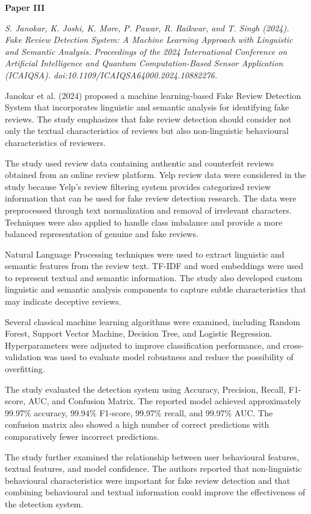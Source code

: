\documentclass[12pt,a4paper]{report}
\begin{document}
\textbf{Paper III}

\textit{S. Janokar, K. Joshi, K. More, P. Pawar, R. Raikwar, and T. Singh (2024). Fake Review Detection System: A Machine Learning Approach with Linguistic and Semantic Analysis. Proceedings of the 2024 International Conference on Artificial Intelligence and Quantum Computation-Based Sensor Application (ICAIQSA). doi:10.1109/ICAIQSA64000.2024.10882276.}

Janokar et al. (2024) proposed a machine learning-based Fake Review Detection System that incorporates linguistic and semantic analysis for identifying fake reviews. The study emphasizes that fake review detection should consider not only the textual characteristics of reviews but also non-linguistic behavioural characteristics of reviewers.

The study used review data containing authentic and counterfeit reviews obtained from an online review platform. Yelp review data were considered in the study because Yelp's review filtering system provides categorized review information that can be used for fake review detection research. The data were preprocessed through text normalization and removal of irrelevant characters. Techniques were also applied to handle class imbalance and provide a more balanced representation of genuine and fake reviews.

Natural Language Processing techniques were used to extract linguistic and semantic features from the review text. TF-IDF and word embeddings were used to represent textual and semantic information. The study also developed custom linguistic and semantic analysis components to capture subtle characteristics that may indicate deceptive reviews.

Several classical machine learning algorithms were examined, including Random Forest, Support Vector Machine, Decision Tree, and Logistic Regression. Hyperparameters were adjusted to improve classification performance, and cross-validation was used to evaluate model robustness and reduce the possibility of overfitting.

The study evaluated the detection system using Accuracy, Precision, Recall, F1-score, AUC, and Confusion Matrix. The reported model achieved approximately 99.97\% accuracy, 99.94\% F1-score, 99.97\% recall, and 99.97\% AUC. The confusion matrix also showed a high number of correct predictions with comparatively fewer incorrect predictions.

The study further examined the relationship between user behavioural features, textual features, and model confidence. The authors reported that non-linguistic behavioural characteristics were important for fake review detection and that combining behavioural and textual information could improve the effectiveness of the detection system.
\end{document}

